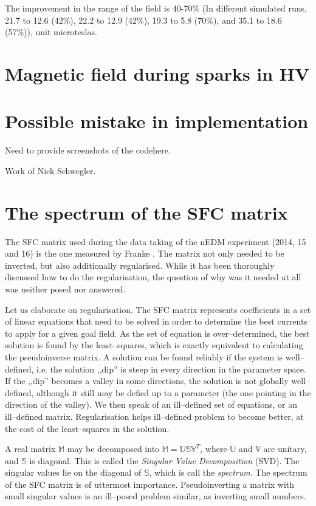 The improvement in the range of the field is 40-70\% (In different simulated runs, 21.7 to 12.6 (42\%), 22.2 to 12.9 (42\%), 19.3 to 5.8 (70\%), and 35.1 to 18.6 (57\%)), unit microteslas.


\section{Magnetic field during sparks in HV}




\section{Possible mistake in implementation}
Need to provide screenshots of the codehere.

Work of Nick Schwegler.


\section{The spectrum of the SFC matrix}
\label{sec:nedm_sfc_matrix}
The SFC matrix used during the data taking of the nEDM experiment (2014, 15 and 16) is the one measured by Franke \cite{Franke2013}. The matrix not only needed to be inverted, but also additionally regularised. While it has been thoroughly discussed how to do the regularisation, the question of why was it needed at all was neither posed nor answered.

Let us elaborate on regularisation. The SFC matrix represents coefficients in a set of linear equations that need to be solved in order to determine the best currents to apply for a given goal field. As the set of equation is over--determined, the best solution is found by the least--squares, which is exactly equivalent to calculating the pseudoinverse matrix. A solution can be found reliably if the system is well--defined, i.e. the solution ,,dip'' is steep in every direction in the parameter space. If the ,,dip'' becomes a valley in some directions, the solution is not globally well--defined, although it still may be defied up to a parameter (the one pointing in the direction of the valley). We then speak of an ill--defined set of equations, or an ill--defined matrix. Regularisation helps ill--defined problem to become better, at the cost of the least--squares in the solution.


A real matrix $\mathbb{M}$ may be decomposed into $\mathbb{M} = \mathbb{U} \mathbb{S} \mathbb{V}^T$, where $\mathbb{U}$ and $\mathbb{V}$ are unitary, and $\mathbb{S}$ is diagonal. This is called the \emph{Singular Value Decomposition} (SVD). The singular values lie on the diagonal of $\mathbb{S}$, which is call the \emph{spectrum}. The spectrum of the SFC matrix is of uttermost importance. Pseudoinverting a matrix with small singular values is an ill--posed problem similar, as inverting small numbers.


